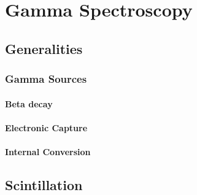 \chapter{Gamma Spectroscopy}

\section{Generalities}

\subsection{Gamma Sources}

\subsubsection{Beta decay}

\subsubsection{Electronic Capture}

\subsubsection{Internal Conversion}

\section{Scintillation}